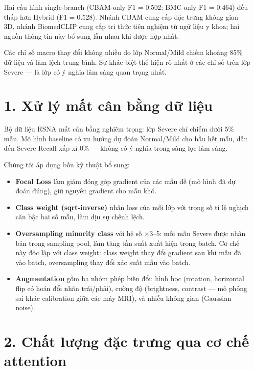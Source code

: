 \documentclass[11pt,a4paper]{article}
\begin{document}
\vspace{0.5em}
\noindent Hai cấu hình single-branch (CBAM-only F1 = 0.502; BMC-only F1 = 0.464) đều thấp hơn Hybrid (F1 = 0.528). Nhánh CBAM cung cấp đặc trưng không gian 3D, nhánh BiomedCLIP cung cấp tri thức tiên nghiệm từ ngữ liệu y khoa; hai nguồn thông tin này bổ sung lẫn nhau khi được hợp nhất.

\vspace{0.5em}
\noindent Các chỉ số macro thay đổi không nhiều do lớp Normal/Mild chiếm khoảng 85\% dữ liệu và làm lệch trung bình. Sự khác biệt thể hiện rõ nhất ở các chỉ số trên lớp Severe --- là lớp có ý nghĩa lâm sàng quan trọng nhất.

\section*{1. Xử lý mất cân bằng dữ liệu}

\noindent Bộ dữ liệu RSNA mất cân bằng nghiêm trọng: lớp Severe chỉ chiếm dưới 5\% mẫu. Mô hình baseline có xu hướng dự đoán Normal/Mild cho hầu hết mẫu, dẫn đến Severe Recall xấp xỉ 0\% --- không có ý nghĩa trong sàng lọc lâm sàng.

\noindent Chúng tôi áp dụng bốn kỹ thuật bổ sung:
\begin{itemize}
\itemsep 1pt
\item \textbf{Focal Loss} làm giảm đóng góp gradient của các mẫu dễ (mô hình đã dự đoán đúng), giữ nguyên gradient cho mẫu khó.
\item \textbf{Class weight (sqrt-inverse)} nhân loss của mỗi lớp với trọng số tỉ lệ nghịch căn bậc hai số mẫu, làm dịu sự chênh lệch.
\item \textbf{Oversampling minority class} với hệ số $\times$3--5: mỗi mẫu Severe được nhân bản trong sampling pool, làm tăng tần suất xuất hiện trong batch. Cơ chế này độc lập với class weight: class weight thay đổi gradient sau khi mẫu đã vào batch, oversampling thay đổi xác suất mẫu vào batch.
\item \textbf{Augmentation} gồm ba nhóm phép biến đổi: hình học (rotation, horizontal flip có hoán đổi nhãn trái/phải), cường độ (brightness, contrast --- mô phỏng sai khác calibration giữa các máy MRI), và nhiễu không gian (Gaussian noise).
\end{itemize}

\section*{2. Chất lượng đặc trưng qua cơ chế attention}
\end{document}
